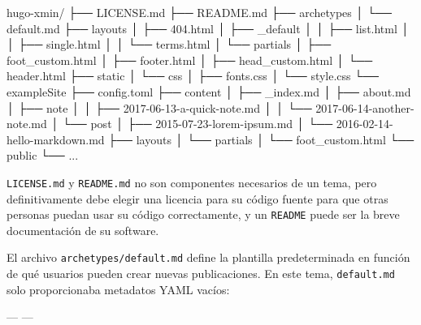\documentclass[12pt,]{krantz}
\makeatletter
\newenvironment{Shaded}{\begin{snugshade}}{\end{snugshade}}
\newcommand{\ExtensionTok}[1]{#1}
\newcommand{\NormalTok}[1]{#1}
\newcommand{\OtherTok}[1]{\textcolor[rgb]{0.56,0.35,0.01}{#1}}
\newenvironment{kframe}{%
\medskip{}
\setlength{\fboxsep}{.8em}
 \def\at@end@of@kframe{}%
 \ifinner\ifhmode%
  \def\at@end@of@kframe{\end{minipage}}%
  \begin{minipage}{\columnwidth}%
 \fi\fi%
 \def\FrameCommand##1{\hskip\@totalleftmargin \hskip-\fboxsep
 \colorbox{shadecolor}{##1}\hskip-\fboxsep
     \hskip-\linewidth \hskip-\@totalleftmargin \hskip\columnwidth}%
 \MakeFramed {\advance\hsize-\width
   \@totalleftmargin\z@ \linewidth\hsize
   \@setminipage}}%
 {\par\unskip\endMakeFramed%
 \at@end@of@kframe}
\renewenvironment{Shaded}{\begin{kframe}}{\end{kframe}}
\theoremstyle{definition}
\theoremstyle{definition}
\theoremstyle{definition}
\theoremstyle{remark}
\makeatother
\begin{document}
\begin{Shaded}
\begin{Highlighting}[]
\ExtensionTok{hugo-xmin/}
\NormalTok{├── }\ExtensionTok{LICENSE.md}
\NormalTok{├── }\ExtensionTok{README.md}
\NormalTok{├── }\ExtensionTok{archetypes}
\NormalTok{│   └── }\ExtensionTok{default.md}
\NormalTok{├── }\ExtensionTok{layouts}
\NormalTok{│   ├── }\ExtensionTok{404.html}
\NormalTok{│   ├── }\ExtensionTok{_default}
\NormalTok{│   │   ├── }\ExtensionTok{list.html}
\NormalTok{│   │   ├── }\ExtensionTok{single.html}
\NormalTok{│   │   └── }\ExtensionTok{terms.html}
\NormalTok{│   └── }\ExtensionTok{partials}
\NormalTok{│       ├── }\ExtensionTok{foot_custom.html}
\NormalTok{│       ├── }\ExtensionTok{footer.html}
\NormalTok{│       ├── }\ExtensionTok{head_custom.html}
\NormalTok{│       └── }\ExtensionTok{header.html}
\NormalTok{├── }\ExtensionTok{static}
\NormalTok{│   └── }\ExtensionTok{css}
\NormalTok{│       ├── }\ExtensionTok{fonts.css}
\NormalTok{│       └── }\ExtensionTok{style.css}
\NormalTok{└── }\ExtensionTok{exampleSite}
\NormalTok{    ├── }\ExtensionTok{config.toml}
\NormalTok{    ├── }\ExtensionTok{content}
\NormalTok{    │   ├── }\ExtensionTok{_index.md}
\NormalTok{    │   ├── }\ExtensionTok{about.md}
\NormalTok{    │   ├── }\ExtensionTok{note}
\NormalTok{    │   │   ├── }\ExtensionTok{2017-06-13-a-quick-note.md}
\NormalTok{    │   │   └── }\ExtensionTok{2017-06-14-another-note.md}
\NormalTok{    │   └── }\ExtensionTok{post}
\NormalTok{    │       ├── }\ExtensionTok{2015-07-23-lorem-ipsum.md}
\NormalTok{    │       └── }\ExtensionTok{2016-02-14-hello-markdown.md}
\NormalTok{    ├── }\ExtensionTok{layouts}
\NormalTok{    │   └── }\ExtensionTok{partials}
\NormalTok{    │       └── }\ExtensionTok{foot_custom.html}
\NormalTok{    └── }\ExtensionTok{public}
\NormalTok{        └── }\ExtensionTok{...}
\end{Highlighting}
\end{Shaded}

\texttt{LICENSE.md} y \texttt{README.md} no son componentes necesarios
de un tema, pero definitivamente debe elegir una licencia para su código
fuente para que otras personas puedan usar su código correctamente, y un
\texttt{README} puede ser la breve documentación de su software.

El archivo \texttt{archetypes/default.md} define la plantilla
predeterminada en función de qué usuarios pueden crear nuevas
publicaciones. En este tema, \texttt{default.md} solo proporcionaba
metadatos YAML vacíos:

\begin{Shaded}
\begin{Highlighting}[]
\OtherTok{---}
\OtherTok{---}
\end{Highlighting}
\end{Shaded}
\end{document}
